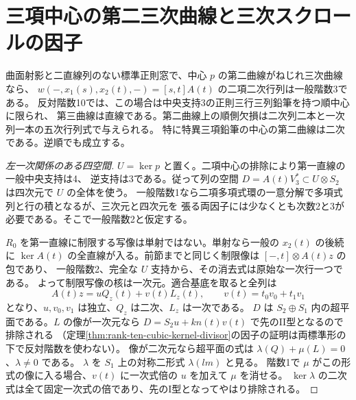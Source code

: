 \section{三項中心の第二三次曲線と三次スクロールの因子}
\label{sec:ternary-center-cubic-scroll}
\begin{theorem}\label{thm:ternary-center-cubic-scroll}
曲面射影と二直線列のない標準正則窓で、中心 $p$ の第二曲線がねじれ三次曲線なら、
$w(-,x_1(s),x_2(t),-)=[s,t]A(t)$ の二項二次行列は一般階数3である。
反対階数10では、この場合は中央支持3の正則三行三列鉛筆を持つ順中心に限られ、
第三曲線は直線である。第二曲線上の順側欠損は二次列二本と一次列一本の五次行列式で与えられる。
特に特異三項鉛筆の中心の第二曲線は二次である。逆順でも成立する。
\end{theorem}
\begin{proof}[左一次関係のある四空間]
$U=\ker p$ と置く。二項中心の排除により第一直線の一般中央支持は4、
逆支持は3である。従って列の空間 $D=A(t)V_3^*\subset U\otimes S_2$ は四次元で $U$ の全体を使う。
一般階数1なら二項多項式環の一意分解で多項式列と行の積となるが、三次元と四次元を
張る両因子には少なくとも次数2と3が必要である。そこで一般階数2と仮定する。

$R_0$ を第一直線に制限する写像は単射ではない。単射なら一般の $x_2(t)$ の後続に
$\ker A(t)$ の全直線が入る。前節までと同じく制限像は $[-,t]\otimes A(t)z$ の包であり、
一般階数2、完全な $U$ 支持から、その消去式は原始な一次行一つである。
よって制限写像の核は一次元。適合基底を取ると全列は
\[
          A(t)z=uQ_z(t)+v(t)L_z(t),\qquad
          v(t)=t_0v_0+t_1v_1
\]
となり、$u,v_0,v_1$ は独立、$Q_z$ は二次、$L_z$ は一次である。
$D$ は $S_2\oplus S_1$ 内の超平面である。$L$ の像が一次元なら
$D=S_2u+k n(t)v(t)$ で先のII型となるので排除される
（定理\ref{thm:rank-ten-cubic-kernel-divisor}の因子の証明は両標準形の下で反対階数を使わない）。
像が二次元なら超平面の式は $\lambda(Q)+\mu(L)=0$、$\lambda\ne0$ である。
$\lambda$ を $S_1$ 上の対称二形式 $\lambda(lm)$ と見る。
階数1で $\mu$ がこの形式の像に入る場合、$v(t)$ に一次式倍の $u$ を加えて $\mu$ を消せる。
$\ker\lambda$ の二次式は全て固定一次式の倍であり、先のI型となってやはり排除される。
\end{proof}
